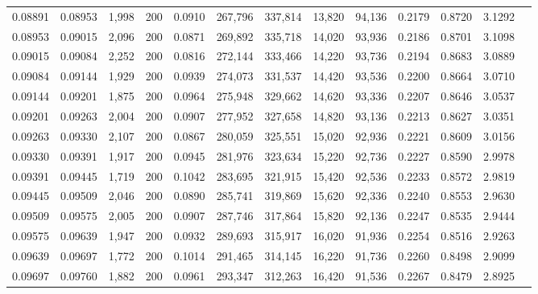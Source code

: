 \begin{tabular}{rrrrrrrrrrrrr}
0.08891 & 0.08953 &  1,998 & 200 &                                     0.0910 & 267,796 & 337,814 &  13,820 &  94,136 & 0.2179 & 0.8720 & 3.1292 \\
0.08953 & 0.09015 &  2,096 & 200 &                                     0.0871 & 269,892 & 335,718 &  14,020 &  93,936 & 0.2186 & 0.8701 & 3.1098 \\
0.09015 & 0.09084 &  2,252 & 200 &                                     0.0816 & 272,144 & 333,466 &  14,220 &  93,736 & 0.2194 & 0.8683 & 3.0889 \\
0.09084 & 0.09144 &  1,929 & 200 &                                     0.0939 & 274,073 & 331,537 &  14,420 &  93,536 & 0.2200 & 0.8664 & 3.0710 \\
0.09144 & 0.09201 &  1,875 & 200 &                                     0.0964 & 275,948 & 329,662 &  14,620 &  93,336 & 0.2207 & 0.8646 & 3.0537 \\
0.09201 & 0.09263 &  2,004 & 200 &                                     0.0907 & 277,952 & 327,658 &  14,820 &  93,136 & 0.2213 & 0.8627 & 3.0351 \\
0.09263 & 0.09330 &  2,107 & 200 &                                     0.0867 & 280,059 & 325,551 &  15,020 &  92,936 & 0.2221 & 0.8609 & 3.0156 \\
0.09330 & 0.09391 &  1,917 & 200 &                                     0.0945 & 281,976 & 323,634 &  15,220 &  92,736 & 0.2227 & 0.8590 & 2.9978 \\
0.09391 & 0.09445 &  1,719 & 200 &                                     0.1042 & 283,695 & 321,915 &  15,420 &  92,536 & 0.2233 & 0.8572 & 2.9819 \\
0.09445 & 0.09509 &  2,046 & 200 &                                     0.0890 & 285,741 & 319,869 &  15,620 &  92,336 & 0.2240 & 0.8553 & 2.9630 \\
0.09509 & 0.09575 &  2,005 & 200 &                                     0.0907 & 287,746 & 317,864 &  15,820 &  92,136 & 0.2247 & 0.8535 & 2.9444 \\
0.09575 & 0.09639 &  1,947 & 200 &                                     0.0932 & 289,693 & 315,917 &  16,020 &  91,936 & 0.2254 & 0.8516 & 2.9263 \\
0.09639 & 0.09697 &  1,772 & 200 &                                     0.1014 & 291,465 & 314,145 &  16,220 &  91,736 & 0.2260 & 0.8498 & 2.9099 \\
0.09697 & 0.09760 &  1,882 & 200 &                                     0.0961 & 293,347 & 312,263 &  16,420 &  91,536 & 0.2267 & 0.8479 & 2.8925 \\

\end{tabular}
